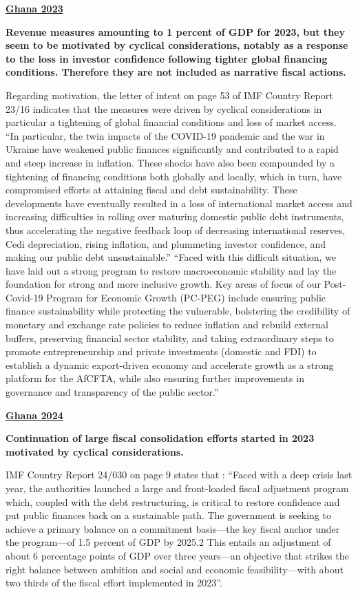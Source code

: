 \textbf{\underline{Ghana 2023}}

\textbf{Revenue measures amounting to 1 percent of GDP for 2023, but they seem to be motivated by cyclical considerations, notably as a response to the loss in investor confidence following tighter global financing conditions. Therefore they are not included as narrative fiscal actions.}

Regarding motivation, the letter of intent on page 53 of IMF Country Report 23/16 indicates that the measures were driven by cyclical considerations in particular a tightening of global financial conditions and loss of market access.  “In particular, the twin impacts of the COVID-19 pandemic and the war in Ukraine have weakened public finances significantly and contributed to a rapid and steep increase in inflation. These shocks have also been compounded by a tightening of financing conditions both globally and locally, which in turn, have compromised efforts at attaining fiscal and debt sustainability. These developments have eventually resulted in a loss of international market access and increasing difficulties in rolling over maturing domestic public debt instruments, thus accelerating the negative feedback loop of decreasing international reserves, Cedi depreciation, rising inflation, and plummeting investor confidence, and making our public debt unsustainable.” 
“Faced with this difficult situation, we have laid out a strong program to restore macroeconomic stability and lay the foundation for strong and more inclusive growth. Key areas of focus of our Post-Covid-19 Program for Economic Growth (PC-PEG) include ensuring public finance sustainability while protecting the vulnerable, bolstering the credibility of monetary and exchange rate policies to reduce inflation and rebuild external buffers, preserving financial sector stability, and taking extraordinary steps to promote entrepreneurship and private investments (domestic and FDI) to establish a dynamic export-driven economy and accelerate growth as a strong platform for the AfCFTA, while also ensuring further improvements in governance and transparency of the public sector.”

\textbf{\underline{Ghana 2024}}

\textbf{Continuation of large fiscal consolidation efforts started in 2023 motivated by cyclical considerations.}

IMF Country Report 24/030 on page 9 states that : “Faced with a deep crisis last year, the authorities launched a large and front-loaded fiscal adjustment program which, coupled with the debt restructuring, is critical to restore confidence and put public finances back on a sustainable path. The government is seeking to achieve a primary balance on a commitment basis—the key fiscal anchor under the program—of 1.5 percent of GDP by 2025.2 This entails an adjustment of about 6 percentage points of GDP over three years—an objective that strikes the right balance between ambition and social and economic feasibility—with about two thirds of the fiscal effort implemented in 2023”.

